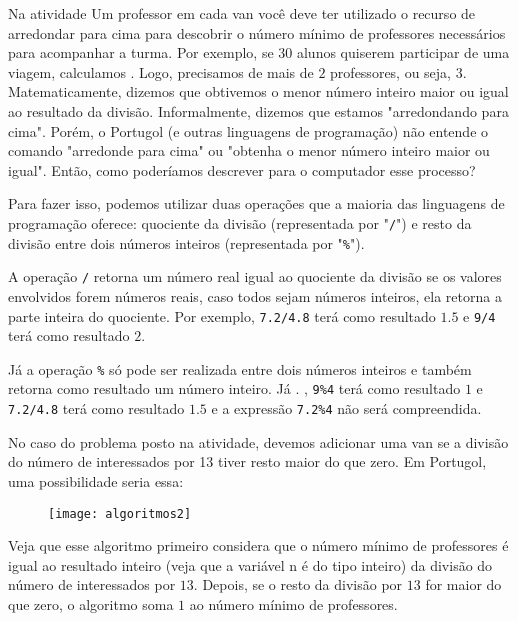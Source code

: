 Na atividade Um professor em cada van você deve ter utilizado o recurso de arredondar para cima para descobrir o número mínimo de professores necessários para acompanhar a turma. Por exemplo, se $30$ alunos quiserem participar de uma viagem, calculamos . Logo, precisamos de mais de $2$ professores, ou seja, $3$. Matematicamente, dizemos que obtivemos o menor número inteiro maior ou igual ao resultado da divisão. Informalmente, dizemos que estamos "arredondando para cima". Porém, o Portugol (e outras linguagens de programação) não entende o comando "arredonde para cima"{} ou "obtenha o menor número inteiro maior ou igual". Então, como poderíamos descrever para o computador esse processo?

Para fazer isso, podemos utilizar duas operações que a maioria das linguagens de programação oferece: quociente da divisão (representada por "\verb|/|") e resto da divisão entre dois números inteiros (representada por "\verb|%|").

A operação \verb|/| retorna um número real igual ao quociente da divisão se os valores envolvidos forem números reais, caso todos sejam números inteiros, ela retorna a parte inteira do quociente. Por exemplo, \verb|7.2/4.8| terá como resultado $1.5$ e \verb|9/4| terá como resultado $2$.

Já a operação \verb|%| só pode ser realizada entre dois números inteiros e também retorna como resultado um número inteiro. Já . , \verb|9%4| terá como resultado $1$ e \verb|7.2/4.8| terá como resultado $1.5$ e a expressão \verb|7.2%4| não será compreendida.

No caso do problema posto na atividade, devemos adicionar uma van se a divisão do número de interessados por 13 tiver resto maior do que zero. Em Portugol, uma possibilidade seria essa:

\begin{figure}[H]
\centering

\texttt{[image: algoritmos2]}
\end{figure}

Veja que esse algoritmo primeiro considera que o número mínimo de professores é igual ao resultado inteiro (veja que a variável n é do tipo inteiro) da divisão do número de interessados por $13$. Depois, se o resto da divisão por $13$ for maior do que zero, o algoritmo soma $1$ ao número mínimo de professores.


